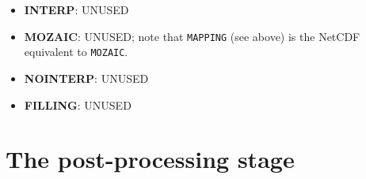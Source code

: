 \begin{itemize}
\item {\bf INTERP}: UNUSED

\item {\bf MOZAIC}: UNUSED; note that {\tt MAPPING} (see above) is the
  NetCDF equivalent to {\tt MOZAIC}.

\item {\bf NOINTERP}: UNUSED

\item {\bf FILLING}: UNUSED

\end{itemize}

\section{The post-processing stage}
\label{subsec_cooking}

